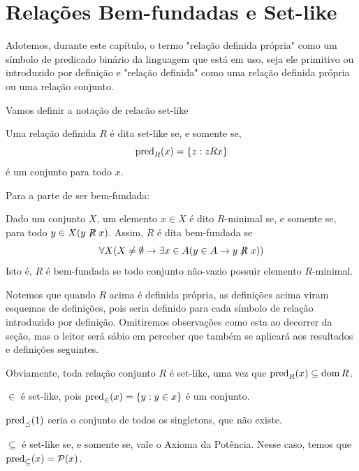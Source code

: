 \section{Relações Bem-fundadas e Set-like}
Adotemos, durante este capítulo, o termo "relação definida própria" como um símbolo de predicado binário da linguagem que está em uso, seja ele primitivo ou introduzido por definição e "relação definida" como uma relação definida própria ou uma relação conjunto.

Vamos definir a notação de relacão set-like

\begin{definition}
    Uma relação definida $ R $ é dita set-like se, e somente se,
    $$
        \operatorname{pred}_R(x) = \left\{ z : zRx \right\}
    $$
    é um conjunto para todo $ x $.
\end{definition}

Para a parte de ser bem-fundada:

\begin{definition}
    Dado um conjunto $ X $, um elemento $x\in X$ é dito $R$-minimal se, e somente se, para todo $y\in X(y\centernot R x)$. Assim, $R$ é dita bem-fundada se
    $$
    \forall X(X\neq \emptyset \to \exists x\in A (y\in A \to y\centernot R x))
    $$
    Isto é, $R$ é bem-fundada se todo conjunto não-vazio possuir elemento $R$-minimal.
\end{definition}

\begin{remark}
    Notemos que quando $R$ acima é definida própria, as definições acima viram esquemas de definições, pois seria definido para cada símbolo de relação introduzido por definição. Omitiremos observações como esta ao decorrer da seção, mas o leitor será sábio em perceber que também se aplicará aos resultados e definições seguintes.
    
    Obviamente, toda relação conjunto $R$ é set-like, uma vez que $\operatorname{pred}_R(x) \subseteq \operatorname{dom} R$. 
\end{remark}

\begin{example}
    $\in$ é set-like, pois $\operatorname{pred}_\in(x) = \{y: y\in x\}$ é um conjunto.
\end{example}
\begin{example}
    $\operatorname{pred}_\preceq(1)$ seria o conjunto de todos os singletons, que não existe.   
\end{example}

\begin{example}
    $\subseteq$ é set-like se, e somente se, vale o Axioma da Potência. Nesse caso, temos que $\operatorname{pred}_\subseteq(x) = \mathcal P(x)$.
\end{example}

